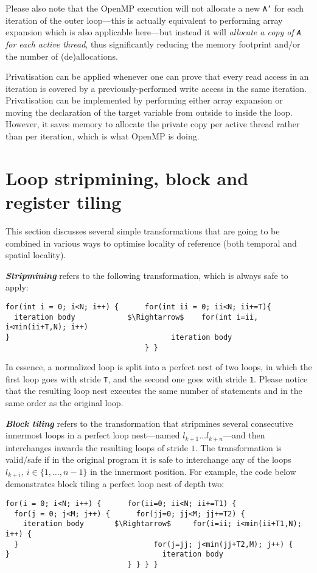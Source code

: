 Please also note that the OpenMP execution will not allocate
a new \texttt{A'} for each iteration of the outer loop---this is
actually equivalent to performing array expansion which is also
applicable here---but instead it will {\em allocate a copy of
  \texttt{A} for each active thread}, thus significantly reducing
the memory footprint and/or the number of (de)allocations.

Privatisation can be applied whenever one can prove that every read
access in an iteration is covered by a previously-performed write
access in the same iteration.  Privatisation can be implemented by
performing either array expansion or moving the declaration of the
target variable from outside to inside the loop. However, it saves
memory to allocate the private copy per active thread rather than per
iteration, which is what OpenMP is doing.

\section{Loop stripmining, block and register tiling}
\label{sec:strip-tiling}

This section discusses several simple transformations that are going
to be combined in various ways to optimise locality of reference (both
temporal and spatial locality).

\textbf{\em Stripmining} refers to the following transformation,
which is always safe to apply:
\begin{lstlisting}[mathescape=true]
for(int i = 0; i<N; i++) {      for(int ii = 0; ii<N; ii+=T){
  iteration body            $\Rightarrow$    for(int i=ii, i<min(ii+T,N); i++)
}                                     iteration body
                                } }
\end{lstlisting}
In essence, a normalized loop is split into a perfect nest of two
loops, in which the first loop goes with stride \texttt{T}, and
the second one goes with stride \texttt{1}. Please notice that the
resulting loop nest executes the same number of statements and
in the same order as the original loop.

\textbf{\em Block tiling} refers to the transformation that
stripmines several consecutive innermost loops in a
perfect loop nest---named $l_{k+1}\ldots l_{k+n}$---and then
interchanges inwards the resulting loops of stride $1$.
The transformation is valid/safe if in the original program
it is safe to interchange any of the loops
$l_{k+i},~i\in\{1,\ldots,n-1\}$ in the innermost position.
For example, the code below demonstrates block tiling a perfect
loop nest of depth two:
\begin{lstlisting}[mathescape=true]
for(i = 0; i<N; i++) {      for(ii=0; ii<N; ii+=T1) {
  for(j = 0; j<M; j++) {      for(jj=0; jj<M; jj+=T2) {
    iteration body       $\Rightarrow$     for(i=ii; i<min(ii+T1,N); i++) {
  }                               for(j=jj; j<min(jj+T2,M); j++) {
}                                   iteration body
                            } } } }
\end{lstlisting}

